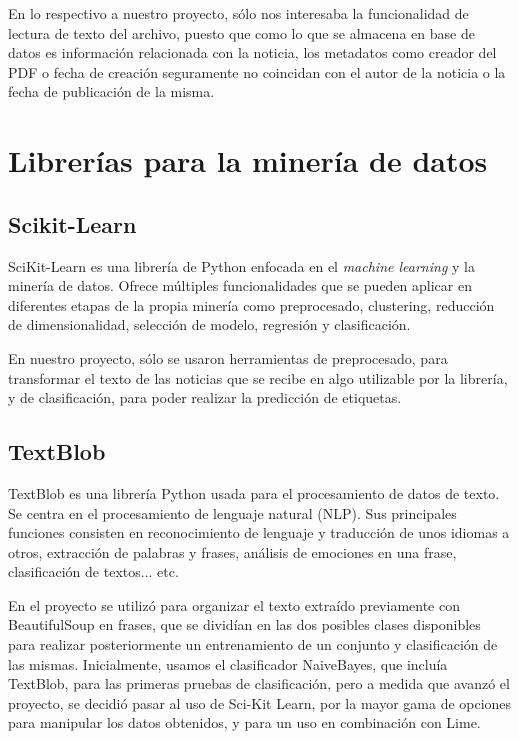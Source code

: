 En lo respectivo a nuestro proyecto, sólo nos interesaba la funcionalidad de lectura de texto del archivo, puesto que como lo que se almacena en base de datos es información relacionada con la noticia, los metadatos como creador del PDF o fecha de creación seguramente no coincidan con el autor de la noticia o la fecha de publicación de la misma.

\section{Librerías para la minería de datos}

\subsection{Scikit-Learn}

SciKit-Learn \cite{pedregosa2011scikit} \cite{scikitlearn} es una librería de Python enfocada en el \emph{machine learning} y la minería de datos. Ofrece múltiples funcionalidades que se pueden aplicar en diferentes etapas de la propia minería como preprocesado, clustering, reducción de dimensionalidad, selección de modelo, regresión y clasificación.

En nuestro proyecto, sólo se usaron herramientas de preprocesado, para transformar el texto de las noticias que se recibe en algo utilizable por la librería, y de clasificación, para poder realizar la predicción de etiquetas.


\subsection{TextBlob}

TextBlob \cite{loria2014textblob} es una librería Python usada para el procesamiento de datos de texto. Se centra en el procesamiento de lenguaje natural (NLP). Sus principales funciones consisten en reconocimiento de lenguaje y traducción de unos idiomas a otros, extracción de palabras y frases, análisis de emociones en una frase, clasificación de textos... etc.

En el proyecto se utilizó para organizar el texto extraído previamente con BeautifulSoup en frases, que se dividían en las dos posibles clases disponibles para realizar posteriormente un entrenamiento de un conjunto y clasificación de las mismas. Inicialmente, usamos el clasificador NaiveBayes, que incluía TextBlob, para las primeras pruebas de clasificación, pero a medida que avanzó el proyecto, se decidió pasar al uso de Sci-Kit Learn, por la mayor gama de opciones para manipular los datos obtenidos, y para un uso en combinación con Lime.


